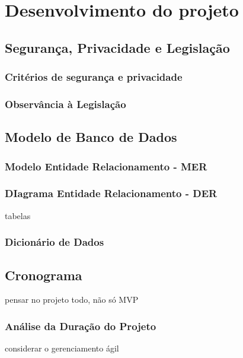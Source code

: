 	\chapter{Desenvolvimento do projeto}
	
	
	
	
	


	
	
	

	\section{Segurança, Privacidade e Legislação}
	\subsection{Critérios de segurança e privacidade}
	\subsection{Observância à Legislação}
	\section{Modelo de Banco de Dados}
	\subsection{Modelo Entidade Relacionamento - MER}
	\subsection{DIagrama Entidade Relacionamento - DER}
	tabelas
	\subsection{Dicionário de Dados}
	\section{Cronograma}
	pensar no projeto todo, não só MVP
	\subsection{Análise da Duração do Projeto}
	considerar o gerenciamento ágil